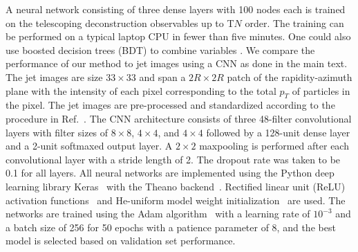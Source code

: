 \documentclass[notoc,preprintnumbers]{JHEP3}
\DeclareRobustCommand{\Ref}[1]{Ref.~\cite{#1}}
\begin{document}
A neural network consisting of three dense layers with 100 nodes each is trained on the telescoping deconstruction observables up to T$N$ order. The training can be performed on a typical laptop CPU in fewer than five minutes. One could also use boosted decision trees (BDT) to combine variables \cite{Chien:2017xrb}. We compare the performance of our method to jet images using a CNN as done in the main text. The jet images are size $33\times 33$ and span a $2R\times 2R$ patch of the rapidity-azimuth plane with the intensity of each pixel corresponding to the total $p_T$ of particles in the pixel. The jet images are pre-processed and standardized according to the procedure in \Ref{Komiske:2016rsd}. The CNN architecture consists of three 48-filter convolutional layers with filter sizes of $8\times 8$, $4\times 4$, and $4\times 4$ followed by a 128-unit dense layer and a 2-unit softmaxed output layer. A $2\times 2$ maxpooling is performed after each convolutional layer with a stride length of 2. The dropout rate was taken to be 0.1 for all layers. All neural networks are implemented using the Python deep learning library Keras~\cite{keras} with the Theano backend~\cite{bergstra2010theano}. Rectified linear unit (ReLU) activation functions~\cite{nair2010rectified} and He-uniform model weight initialization~\cite{heuniform} are used. The networks are trained using the Adam algorithm~\cite{adam} with a learning rate of $10^{-3}$ and a batch size of 256 for 50 epochs with a patience parameter of 8, and the best model is selected based on validation set performance.
\end{document}
